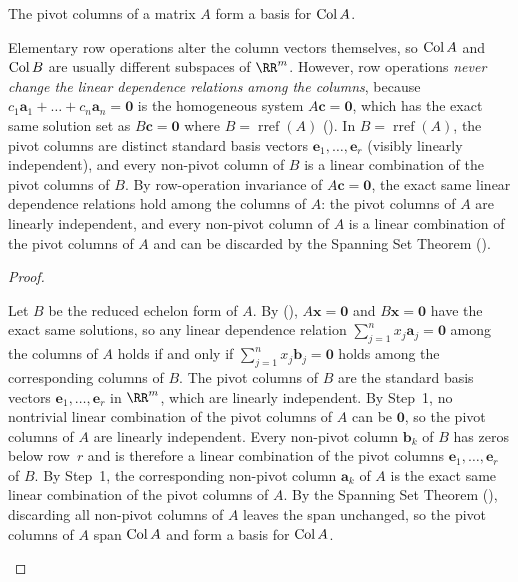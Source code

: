 \documentclass[10pt]{scrartcl}
\newcommand{\vv}[1]{\mathbf{#1}}
\begin{document}
\begin{theorem*}
  The pivot columns of a matrix $A$ form a basis for $\operatorname{Col} A$.
\end{theorem*}
\begin{ideabox}
  Elementary row operations alter the column vectors themselves, so $\operatorname{Col} A$ and $\operatorname{Col} B$ are usually different subspaces of $\RR^m$. However, row operations \emph{never change the linear dependence relations among the columns}, because $c_1\vv a_1+\dots+c_n\vv a_n=\vv 0$ is the homogeneous system $A\vv c=\vv 0$, which has the exact same solution set as $B\vv c=\vv 0$ where $B=\operatorname{rref}(A)$ (). In $B=\operatorname{rref}(A)$, the pivot columns are distinct standard basis vectors $\vv e_1,\dots,\vv e_r$ (visibly linearly independent), and every non-pivot column of $B$ is a linear combination of the pivot columns of $B$. By row-operation invariance of $A\vv c=\vv 0$, the exact same linear dependence relations hold among the columns of $A$: the pivot columns of $A$ are linearly independent, and every non-pivot column of $A$ is a linear combination of the pivot columns of $A$ and can be discarded by the Spanning Set Theorem ().
\end{ideabox}
\begin{proof}
  \begin{steps}
    \ii Let $B$ be the reduced echelon form of $A$. By (), $A\vv x=\vv 0$ and $B\vv x=\vv 0$ have the exact same solutions, so any linear dependence relation $\sum_{j=1}^n x_j\vv a_j=\vv 0$ among the columns of $A$ holds if and only if $\sum_{j=1}^n x_j\vv b_j=\vv 0$ holds among the corresponding columns of $B$.
    \ii The pivot columns of $B$ are the standard basis vectors $\vv e_1,\dots,\vv e_r$ in $\RR^m$, which are linearly independent. By Step~1, no nontrivial linear combination of the pivot columns of $A$ can be $\vv 0$, so the pivot columns of $A$ are linearly independent.
    \ii Every non-pivot column $\vv b_k$ of $B$ has zeros below row~$r$ and is therefore a linear combination of the pivot columns $\vv e_1,\dots,\vv e_r$ of $B$. By Step~1, the corresponding non-pivot column $\vv a_k$ of $A$ is the exact same linear combination of the pivot columns of $A$.
    \ii By the Spanning Set Theorem (), discarding all non-pivot columns of $A$ leaves the span unchanged, so the pivot columns of $A$ span $\operatorname{Col} A$ and form a basis for $\operatorname{Col} A$.
  \end{steps}
\end{proof}
\end{document}
